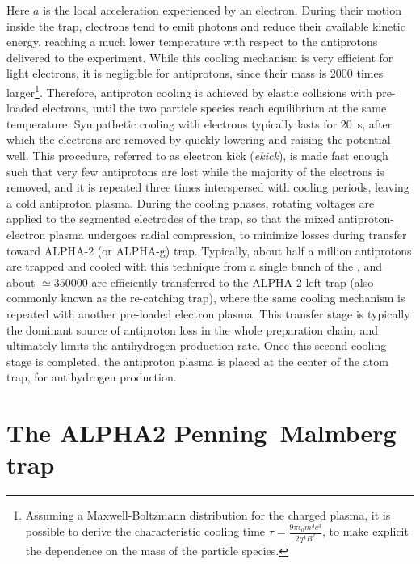 Here $a$ is the local acceleration experienced by an electron. During their motion inside the trap, electrons tend to emit photons and reduce their available kinetic energy, reaching a much lower temperature with respect to the antiprotons delivered to the experiment. While this cooling mechanism is very efficient for light electrons, it is negligible for antiprotons, since their mass is 2000 times larger\footnote{Assuming a Maxwell-Boltzmann distribution for the charged plasma, it is possible to derive the characteristic cooling time   $\tau = \frac{9 \pi \epsilon_{0} m^{3} c^{3}}{2 q^{4} B^{2}}$, to make explicit the dependence on the mass of the particle species.}. Therefore, antiproton cooling is achieved by elastic collisions with pre-loaded electrons, until the two particle species reach equilibrium at the same temperature.
Sympathetic cooling with electrons typically lasts for \SI{20}{\second}, after which the electrons are removed by quickly lowering and raising the potential well. This procedure, referred to as electron kick (\textit{ekick}), is made fast enough such that very few antiprotons are lost while the majority of the electrons is removed, and it is repeated three times interspersed with cooling periods, leaving a cold antiproton plasma. During the cooling phases, rotating voltages are applied to the segmented electrodes of the trap, so that the mixed antiproton-electron plasma undergoes radial compression, to minimize losses during transfer toward ALPHA-2 (or ALPHA-g) trap.
 Typically, about half a million antiprotons are trapped and cooled with this technique from a single bunch of the \AD, and about $\simeq 350000$  are efficiently transferred to the ALPHA-2 left trap (also commonly known as the re-catching trap), where the same cooling mechanism is repeated with another pre-loaded electron plasma. This transfer stage is typically the dominant source of antiproton loss in the whole preparation chain, and ultimately limits the antihydrogen production rate. Once this second cooling stage is completed, the antiproton plasma is placed at the center of the atom trap, for antihydrogen production. 

\section{The ALPHA2 Penning--Malmberg trap}

